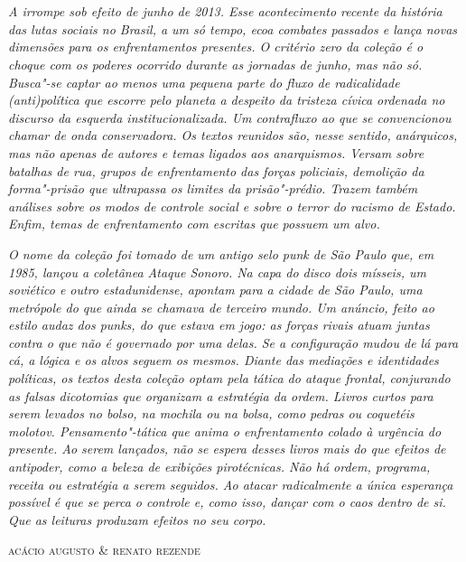 



\chapter*{}
\thispagestyle{empty}

\vspace*{\fill}

\begin{flushright}
\begin{adjustwidth}{2.0cm}{}
\raggedleft\scriptsize\emph{A  irrompe sob efeito de junho de 2013.
Esse acontecimento recente da história das lutas sociais no Brasil, a um só
tempo, ecoa combates passados e lança novas dimensões para os
enfrentamentos presentes. O critério zero da coleção é o choque com os
poderes ocorrido durante as \emph{jornadas de
junho}, mas não só. Busca"-se captar ao menos uma pequena parte do fluxo de
radicalidade (anti)política que escorre pelo planeta a despeito da
tristeza cívica ordenada no discurso da esquerda institucionalizada. Um
contrafluxo ao que se convencionou chamar de onda conservadora. Os
textos reunidos são, nesse sentido,
anárquicos, mas não apenas de autores e temas ligados aos
anarquismos. Versam sobre batalhas de
rua, grupos de enfrentamento das forças policiais, demolição da forma"-prisão que
ultrapassa os limites da prisão"-prédio. Trazem também análises sobre os
modos de controle social e sobre o terror do racismo de Estado. Enfim, temas de enfrentamento com
escritas que possuem um alvo.}

\emph{O nome da coleção foi tomado de um antigo
selo punk de São Paulo que, em 1985, lançou a coletânea \emph{Ataque
Sonoro}. Na capa do disco dois mísseis, um soviético e outro
estadunidense, apontam para a cidade de São Paulo, uma metrópole do que
ainda se chamava de terceiro mundo. Um anúncio, feito ao estilo audaz
dos punks, do que estava em jogo: as forças rivais atuam juntas contra o
que não é governado por uma delas. Se a configuração mudou de lá para
cá, a lógica e os alvos seguem os mesmos. Diante das mediações e
identidades políticas, os textos desta coleção optam pela tática do
ataque frontal, conjurando as falsas dicotomias que organizam a
estratégia da ordem. Livros curtos para serem levados no bolso, na
mochila ou na bolsa, como pedras ou coquetéis molotov.
Pensamento"-tática que anima o enfrentamento colado à urgência do
presente. Ao serem lançados, não se espera desses livros mais do que
efeitos de antipoder, como a beleza de exibições pirotécnicas. Não há
ordem, programa, receita ou estratégia a serem seguidos. Ao atacar
radicalmente a única esperança possível é que se perca o controle e,
como isso, dançar com o caos dentro de si. Que as leituras produzam
efeitos no seu corpo.}

\medskip

\textsc{acácio augusto \& renato rezende}
\end{adjustwidth}
\end{flushright}

